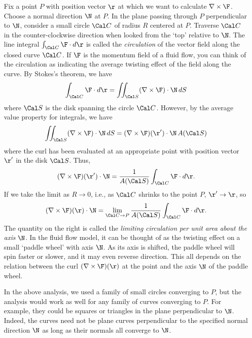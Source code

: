 Fix a point $P$ with position vector
 $\r$ at which we want to calculate $\nabla\times\F$.
Choose a normal direction $\N$ at $P$.  In the plane passing
through $P$ perpendicular to $\N$, consider a small circle
$\Cal C$ of radius $R$ centered at  $P$.  Traverse
$\Cal C$ in the counter-clockwise direction when looked from
the `top' relative to $\N$.  The line integral
$\int_{\Cal C} \F\cdot d\r$
is called the {\it circulation\/} of the vector field along the
closed curve $\Cal C$.  If $\F$ is the momentum field of
a fluid flow, you can think of the circulation as indicating the
average twisting effect of the field along the curve.  By
Stokes's theorem, we have
$$
\int_{\Cal C}\F\cdot d\r = \iint_{\Cal S} (\nabla\times\F)\cdot\N\,dS
$$
where $\Cal S$ is the disk spanning the circle $\Cal C$.
However, by the average value property for integrals, we have
$$
\iint_{\Cal S} (\nabla\times\F)\cdot\N\,dS
= (\nabla\times\F)(\r')\cdot\N\, A(\Cal S)
$$
where the curl has been evaluated at an appropriate point
with position vector $\r'$ in the
disk $\Cal S$.
Thus,
$$
(\nabla\times\F)(\r')\cdot\N
= \frac 1{A(\Cal S)}
\int_{\Cal C}\F\cdot d\r. 
$$
If we take the limit as $R \to 0$, i.e., as $\Cal C$ shrinks to
the point $P$, $\r'\to\r$, so
$$
(\nabla\times\F)(\r)\cdot\N
= \lim_{\Cal C \to P}\frac 1{A(\Cal S)}
\int_{\Cal C}\F\cdot d\r. 
$$
The quantity on the right is called the {\it limiting
circulation  per unit area about the axis\/} $\N$. In 
the fluid flow model, it can be thought of as the twisting effect
on a small `paddle wheel' with axis $\N$.
%
%
  As its axis  is shifted, the paddle wheel
 will spin faster or slower, and it may even 
reverse direction.  This all depends on the relation between the curl
$(\nabla\times\F)(\r)$ at the point and the axis $\N$ of the
paddle wheel.

	In the above analysis, we used a family of small circles
converging to $P$, but
the analysis would work as well for any family of curves converging
to $P$.  For example, they could be squares or triangles in
the plane perpendicular to $\N$.  Indeed, the
curves need not be plane curves perpendicular to the specified
normal direction $\N$ as long as their normals all converge
to $\N$.  

